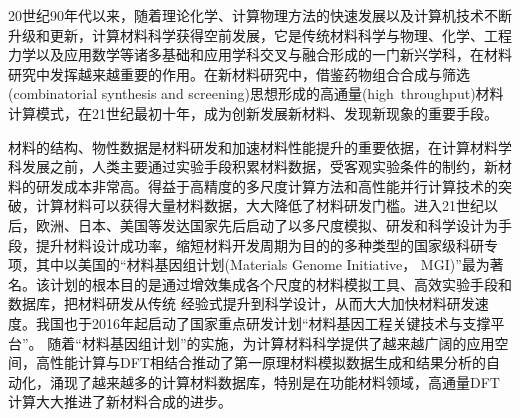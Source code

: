 \maketitle
20世纪90年代以来，随着理论化学、计算物理方法的快速发展以及计算机技术不断升级和更新，计算材料科学获得空前发展，它是传统材料科学与物理、化学、工程力学以及应用数学等诸多基础和应用学科交叉与融合形成的一门新兴学科，在材料研究中发挥越来越重要的作用。在新材料研究中，借鉴药物组合合成与筛选\textrm{(combinatorial synthesis and screening)}思想形成的高通量(\textrm{high~throughput})材料计算模式，在21世纪最初十年，成为创新发展新材料、发现新现象的重要手段。

材料的结构、物性数据是材料研发和加速材料性能提升的重要依据，在计算材料学科发展之前，人类主要通过实验手段积累材料数据，受客观实验条件的制约，新材料的研发成本非常高。得益于高精度的多尺度计算方法和高性能并行计算技术的突破，计算材料可以获得大量材料数据，大大降低了材料研发门槛。进入21世纪以后，欧洲、日本、美国等发达国家先后启动了以多尺度模拟、研发和科学设计为手段，提升材料设计成功率，缩短材料开发周期为目的的多种类型的国家级科研专项，其中以美国的“材料基因组计划\textrm{(Materials Genome Initiative， MGI)}”最为著名。该计划的根本目的是通过增效集成各个尺度的材料模拟工具、高效实验手段和数据库，把材料研发从传统 经验式提升到科学设计，从而大大加快材料研发速度。我国也于2016年起启动了国家重点研发计划“材料基因工程关键技术与支撑平台”。
随着``材料基因组计划''的实施，为计算材料科学提供了越来越广阔的应用空间，高性能计算与\textrm{DFT}相结合推动了第一原理材料模拟数据生成和结果分析的自动化，涌现了越来越多的计算材料数据库，特别是在功能材料领域，高通量\textrm{DFT}计算大大推进了新材料合成的进步。


